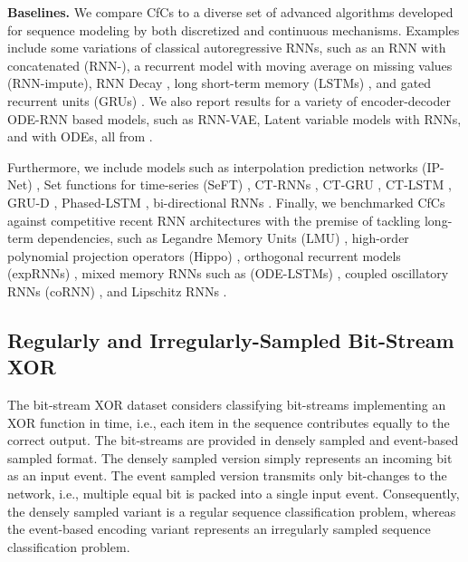 \documentclass[12pt]{article}
\begin{document}
\noindent \textbf{Baselines.}
We compare CfCs to a diverse set of advanced algorithms developed for sequence modeling by both discretized and continuous mechanisms. Examples include some variations of classical autoregressive RNNs, such as an RNN with concatenated  (RNN-), a recurrent model with moving average on missing values (RNN-impute), RNN Decay \cite{rubanova2019latent}, long short-term memory (LSTMs) \cite{hochreiter1997long}, and gated recurrent units (GRUs) \cite{chung2014empirical}. We also report results for a variety of encoder-decoder ODE-RNN based models, such as RNN-VAE, Latent variable models with RNNs, and with ODEs, all from \cite{rubanova2019latent}. 

Furthermore, we include models such as interpolation prediction networks (IP-Net) \cite{shukla2018interpolation}, Set functions for time-series (SeFT) \cite{horn2020set}, CT-RNNs \cite{funahashi1993approximation}, CT-GRU \cite{mozer2017discrete}, CT-LSTM \cite{mei2017neural}, GRU-D \cite{che2018recurrent}, Phased-LSTM \cite{neil2016phased}, bi-directional RNNs \cite{schuster1997bidirectional}. Finally, we benchmarked CfCs against competitive recent RNN architectures with the premise of tackling long-term dependencies, such as Legandre Memory Units (LMU) \cite{voelker2019legendre}, high-order polynomial projection operators (Hippo) \cite{gu2020hippo}, orthogonal recurrent models (expRNNs) \cite{lezcano2019cheap}, mixed memory RNNs such as (ODE-LSTMs) \cite{lechner2020learning}, coupled oscillatory RNNs (coRNN) \cite{rusch2021coupled}, and Lipschitz RNNs \cite{erichson2021lipschitz}. 

\subsection*{Regularly and Irregularly-Sampled Bit-Stream XOR}
The bit-stream XOR dataset \cite{lechner2020learning} considers classifying bit-streams implementing an XOR function in time, i.e., each item in the sequence contributes equally to the correct output. The bit-streams are provided in densely sampled and event-based sampled format. The densely sampled version simply represents an incoming bit as an input event. The event sampled version transmits only bit-changes to the network, i.e., multiple equal bit is packed into a single input event. Consequently, the densely sampled variant is a regular sequence classification problem, whereas the event-based encoding variant represents an irregularly sampled sequence classification problem. 
\end{document}
